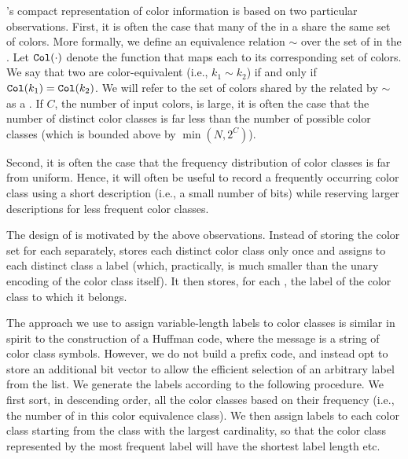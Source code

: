 \rainbowfish's compact representation of color information is based on two particular
observations. First, it is often the case that many of the \kmers in a \cdbg
share the same set of colors. More formally, we define an equivalence relation
$\sim$ over the set of \kmers in the \dbg. Let $\texttt{Col}(\cdot)$ denote the
function that maps each \kmer to its corresponding set of colors. We say that
two \kmers are color-equivalent (i.e., $k_1 \sim k_2$) if and only if
$\texttt{Col}(k_1) = \texttt{Col}(k_2)$. We will refer to the set of colors shared by the
\kmers related by $\sim$ as a . If $C$, the number of input
colors, is large, it is often the case that the number of distinct color classes
is far less than the number of possible color classes (which is bounded above by
$\min(N,2^C)$).

Second, it is often the case that the frequency distribution of color classes
is far from uniform.  Hence, it will often be useful to record a frequently
occurring color class using a short description (i.e., a small number of bits)
while reserving larger descriptions for less frequent color classes.


The design of \rainbowfish is motivated by the above observations. Instead of storing
the color set for each \kmer separately, \rainbowfish stores each distinct color
class only once and assigns to each distinct class a label (which, practically,
is much smaller than the unary encoding of the color class itself).
%
%
%
It then stores, for each \kmer, the label of the color class to which it
belongs. 
%

The approach we use to assign variable-length labels to color classes is similar
in spirit to the construction of a Huffman code, where the message is a string
of color class symbols. However, we do not build a prefix code, and instead opt
to store an additional bit vector to allow the efficient selection of an
arbitrary label from the list. We generate the labels according to the following
procedure. We first sort, in descending order, all the color classes based on
their frequency (i.e., the number of \kmers in this color equivalence class). We
then assign labels to each color class starting from the class with the largest
cardinality, so that the color class represented by the most frequent label will
have the shortest label length etc.

